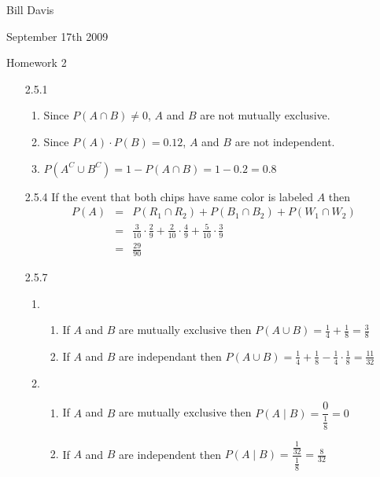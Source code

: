 \documentclass[11pt,fleqn]{article}
\begin{document}
\newcommand{\mbf}[1]{\mbox{{\bfseries #1}}}
\newcommand{\N}{\mbf{N}}
\renewcommand{\O}{\mbf{O}}
\newcommand{\tabfrac}[2]{%
	\setlength{\fboxrule}{0pt}%
	\fbox{$\frac{#1}{#2}$}%
}

\noindent Bill Davis 

\noindent September 17th 2009 

\noindent Homework 2

\begin{enumerate} 

\item[2.5.1]
\begin{enumerate}
\item 
Since $P(A \cap B) \neq 0 $, $A$ and $B$ are not mutually exclusive.
\item
Since $P(A) \cdot P(B) = 0.12$, $A$ and $B$ are not independent.
\item
$P(A^{C} \cup B^{C}) = 1 - P(A \cap B) = 1-0.2 = 0.8$

\end{enumerate}

\item[2.5.4]
If the event that both chips have same color is labeled $A$ then
\begin{eqnarray}
 P(A) &=& P(R_1 \cap R_2) + P(B_1 \cap B_2) + P(W_1 
\cap W_2) \\
&=& \frac{3}{10} \cdot \frac{2}{9} + \frac{2}{10} \cdot \frac{4}{9} +
\frac{5}{10} \cdot \frac{3}{9}\\
&=&\frac{29}{90}
\end{eqnarray}

\item[2.5.7]
\begin{enumerate}
  \item
  \begin{enumerate}
      \item 
      If $A$ and $B$ are mutually exclusive then $P(A \cup B) =
      \frac{1}{4} + \frac{1}{8} = \frac{3}{8}$
      \item 
      If $A$ and $B$ are independant then $P(A \cup B) = \frac{1}{4} +
      \frac{1}{8} - \frac{1}{4} \cdot \frac{1}{8} = \frac{11}{32}$
  \end{enumerate}
  \item
  \begin{enumerate}
      \item 
      If $A$ and $B$ are mutually exclusive then $P(A \mid B) =
      \dfrac{0}{\frac{1}{8}} = 0 $
      \item
      If $A$ and $B$ are independent then $P(A \mid B) =
      \dfrac{\frac{1}{32}}{\frac{1}{8}} = \frac{8}{32}$
  \end{enumerate}
\end{enumerate}


\end{enumerate}
\end{document}
